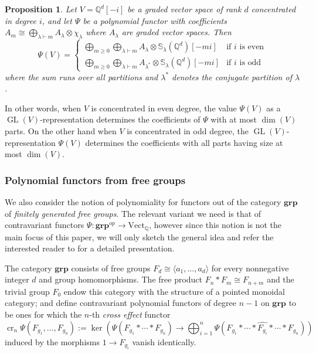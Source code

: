 \documentclass[12pt]{article}
\newcommand{\Q}{\mathbb{Q}}
\newcommand{\Specht}[1]{\chi_{#1}}
\newcommand{\TransposePartition}[1]{{#1}^{\ast}}
\newcommand{\Schur}[1]{\mathbb{S}_{#1}}
\newcommand{\Vect}[1]{\textrm{Vect}_{#1}}
\DeclareMathOperator{\GL}{GL}
\theoremstyle{plain}
\newtheorem{prop}[thm]{Proposition}
\theoremstyle{definition}
\theoremstyle{remark}
\begin{document}
\begin{prop}\label{prop:image-polynomial-concentrated}
Let $V = \Q^d[-i]$ be a graded vector space of rank $d$ concentrated in degree $i$, and let $\Psi$ be a polynomial functor with coefficients $A_m \cong \bigoplus_{\lambda \vdash m}{A_{\lambda}\otimes \Specht{\lambda}}$ where $A_\lambda$ are graded vector spaces. Then
\[
    \Psi(V) = \begin{cases}
        \bigoplus_{m\geq 0}\bigoplus_{\lambda\vdash m}{A_{\lambda}\otimes \Schur{\lambda}(\Q^d)[-mi]} & \textrm{if $i$ is even}  \\
        \bigoplus_{m\geq 0} \bigoplus_{\lambda\vdash m}{A_{\TransposePartition{\lambda}}\otimes \Schur{\lambda}(\Q^d)[-mi]} & \textrm{if $i$ is odd}
    \end{cases}
\]
where the sum runs over all partitions and
$\TransposePartition{\lambda}$ denotes the conjugate partition of $\lambda$.%
\end{prop}

In other words, when $V$ is concentrated in even degree, the value $\Psi(V)$ as a $\GL(V)$-representation determines the coefficients of $\Psi$ with at most $\dim(V)$ parts. On the other hand when $V$ is concentrated in odd degree, the $\GL(V)$-representation $\Psi(V)$ determines the coefficients with all parts having size at most $\dim(V)$.

\subsubsection{Polynomial functors from free groups}\label{sec:polynomiality-gr}
We also consider the notion of polynomiality for functors out of the category $\bm{grp}$ of \emph{finitely generated free groups}. The relevant variant we need is that of contravariant functors  $\Psi\colon \bm{grp}^{op}\to \Vect{\Q}$, however since this notion is not the main focus of this paper, we will only sketch the general idea and refer the interested reader to \cite[\S 3.2]{HPV15} for a detailed presentation.

The category $\bm{grp}$ consists of free groups $F_d \cong \langle a_1,\ldots, a_d\rangle$ for every nonnegative integer $d$ and group homomorphisms. The free product $F_n\ast F_m \cong F_{n+m}$ and the trivial group $F_0$ endow this category with the structure of a pointed monoidal category; and \cite[\S 3]{HPV15} define contravariant polynomial functors of degree $n-1$ on $\bm{grp}$ to be ones for which the $n$-th \emph{cross effect} functor
\[
\operatorname{cr}_n\Psi(F_{g_1},\ldots,F_{g_n}) := \ker\left( \Psi(F_{g_1}*\cdots*F_{g_n} ) \to \bigoplus_{i=1}^n \Psi(F_{g_1}*\cdots*\widehat{F_{g_i}}*\cdots*F_{g_n}) \right)
\]
induced by the morphisms $1\to F_{g_i}$ vanish identically.
\end{document}
